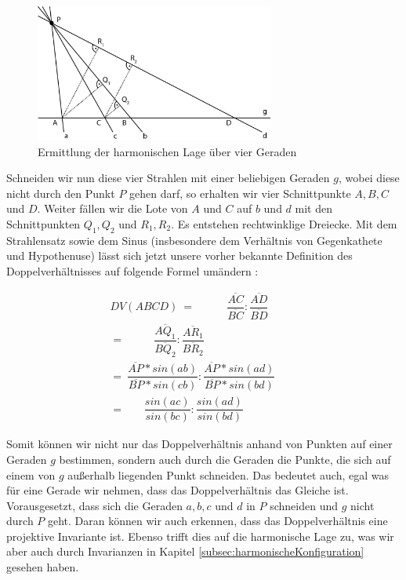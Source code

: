 \documentclass[12pt,a4paper]{article}
\begin{document}
\begin{figure}[htbp] 
\centering
\includegraphics[width=0.7\textwidth]{Bilder/vierGeraden.png}
\caption{Ermittlung der harmonischen Lage über vier Geraden}
\label{fig:vierGeraden}
\end{figure}

Schneiden wir nun diese vier Strahlen mit einer beliebigen Geraden $g$, wobei diese nicht durch den Punkt $P$ gehen darf, so erhalten wir vier Schnittpunkte $A, B, C$ und $D$. Weiter fällen wir die Lote von $A$ und $C$ auf $b$ und $d$ mit den Schnittpunkten $Q_1, Q_2$ und $R_1, R_2$. Es entstehen rechtwinklige Dreiecke. Mit dem Strahlensatz sowie dem Sinus (insbesondere dem Verhältnis von Gegenkathete und Hypothenuse) lässt sich jetzt unsere vorher bekannte Definition des Doppelverhältnisses auf folgende Formel umändern \citep[s.~][S.~80]{projektiveGeometrie}: 

\begin{equation*}
\begin{split}
DV(A B C D)~=~~~~~~~~~~~~~\dfrac{\overline{A C}}{\overline{B C}} : \dfrac{\overline{A D}}{\overline{B D}}~~~~~~~~~~~~\\
=~~~~~~~~~~~~\dfrac{\overline{A Q_1}}{\overline{B Q_2}} : \dfrac{\overline{A R_1}}{\overline{B R_2}}~~~~~~~~~~~\\
=~\dfrac{\overline{A P} * sin(ab)}{\overline{B P} * sin(cb)} : \dfrac{\overline{A P} * sin(ad)}{\overline{B P} * sin(bd)} \\
=~~~~~~~~\dfrac{sin(ac)}{sin(bc)} : \dfrac{sin(ad)}{sin(bd)}~~~~~~~~
\end{split}
\end{equation*}

Somit können wir nicht nur das Doppelverhältnis anhand von Punkten auf einer Geraden $g$ bestimmen, sondern auch durch die Geraden die Punkte, die sich auf einem von $g$ außerhalb liegenden Punkt schneiden. Das bedeutet auch, egal was für eine Gerade wir nehmen, dass das Doppelverhältnis das Gleiche ist. Vorausgesetzt, dass sich die Geraden $a, b, c$ und $d$ in $P$ schneiden und $g$ nicht durch $P$ geht. Daran können wir auch erkennen, dass das Doppelverhältnis eine projektive Invariante ist. Ebenso trifft dies auf die harmonische Lage zu, was wir aber auch durch Invarianzen in Kapitel \ref{subsec:harmonischeKonfiguration} gesehen haben.
\end{document}
